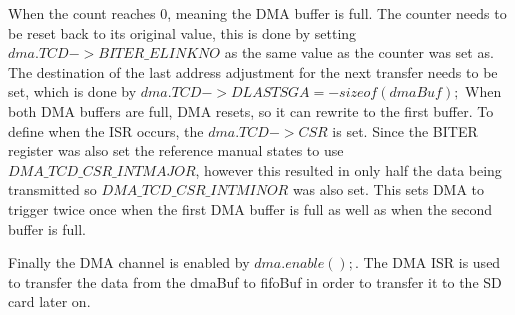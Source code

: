 When the count reaches 0, meaning the DMA buffer is full.
The counter needs to be reset back to its original value, this is done by setting $dma.TCD->BITER\_ELINKNO$ as the same value as the counter was set as.
The destination of the last address adjustment for the next transfer needs to be set, which is done by $dma.TCD->DLASTSGA = -sizeof(dmaBuf);$
When both DMA buffers are full, DMA resets, so it can rewrite to the first buffer.
To define when the ISR occurs, the $dma.TCD->CSR $ is set.
Since the BITER register was also set the reference manual states to use $DMA\_TCD\_CSR\_INTMAJOR$, however this resulted in only half the data being transmitted so $DMA\_TCD\_CSR\_INTMINOR$ was also set.
This sets DMA to trigger twice once when the first DMA buffer is full as well as when the second buffer is full.

Finally the DMA channel is enabled by $dma.enable();$.
The DMA ISR is used to transfer the data from the dmaBuf to fifoBuf in order to transfer it to the SD card later on. 